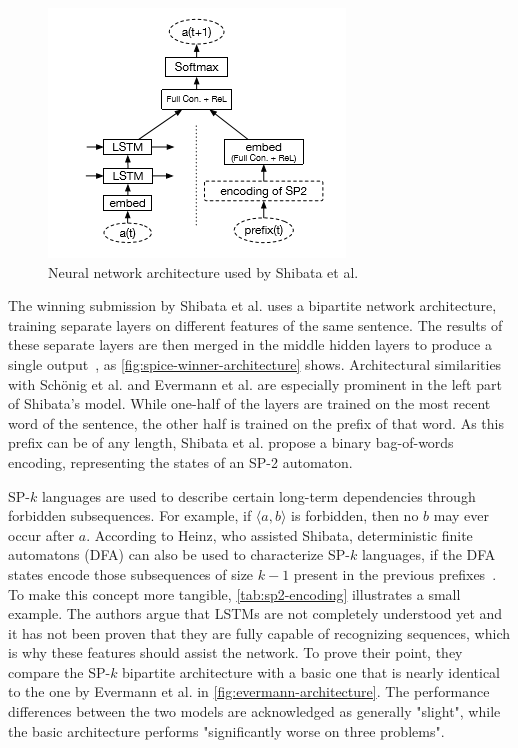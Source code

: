 \begin{figure}
    \centering
    \includegraphics[height=.4\textwidth]{gfx/spice-winner-architecture.png}
    \caption{Neural network architecture used by Shibata et al.~\cite{shibata2016bipartite}}
    \label{fig:spice-winner-architecture}
\end{figure}

The winning submission by Shibata et al. uses a bipartite network architecture, training separate layers on different features of the same sentence. The results of these separate layers are then merged in the middle hidden layers to produce a single output~\cite{shibata2016bipartite}, as \autoref{fig:spice-winner-architecture} shows. Architectural similarities with Schönig et al. and Evermann et al. are especially prominent in the left part of Shibata's model.
While one-half of the layers are trained on the most recent word of the sentence, the other half is trained on the prefix of that word. As this prefix can be of any length, Shibata et al. propose a binary bag-of-words encoding, representing the states of an SP-2 automaton.

SP-$k$ languages are used to describe certain long-term dependencies through forbidden subsequences. For example, if $\langle a,b \rangle$ is forbidden, then no $b$ may ever occur after $a$. According to Heinz, who assisted Shibata, deterministic finite automatons (DFA) can also be used to characterize SP-$k$ languages, if the DFA states encode those subsequences of size $k-1$ present in the previous prefixes~\cite{heinz2010estimatingSP}. To make this concept more tangible, \autoref{tab:sp2-encoding} illustrates a small example. The authors argue that LSTMs are not completely understood yet and it has not been proven that they are fully capable of recognizing sequences, which is why these features should assist the network. To prove their point, they compare the SP-$k$ bipartite architecture with a basic one that is nearly identical to the one by Evermann et al. in \autoref{fig:evermann-architecture}. The performance differences between the two models are acknowledged as generally "slight", while the basic architecture performs "significantly worse on three problems".\\

